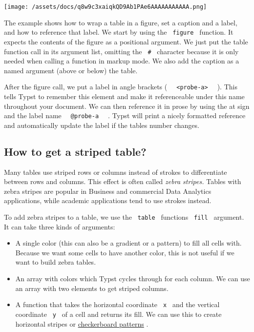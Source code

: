 \texttt{[image: /assets/docs/q8w9c3xaiqkQD9Ab1PAe6AAAAAAAAAAA.png]}

The example shows how to wrap a table in a figure, set a caption and a
label, and how to reference that label. We start by using the
\texttt{\ figure\ } function. It expects the contents of the figure as a
positional argument. We just put the table function call in its argument
list, omitting the \texttt{\ \#\ } character because it is only needed
when calling a function in markup mode. We also add the caption as a
named argument (above or below) the table.

After the figure call, we put a label in angle brackets (
\texttt{\ }{\texttt{\ \textless{}probe-a\textgreater{}\ }}\texttt{\ } ).
This tells Typst to remember this element and make it referenceable
under this name throughout your document. We can then reference it in
prose by using the at sign and the label name
\texttt{\ }{\texttt{\ @probe-a\ }}\texttt{\ } . Typst will print a
nicely formatted reference and automatically update the label if the
table\textquotesingle s number changes.

\subsection{How to get a striped table?}\label{fills}

Many tables use striped rows or columns instead of strokes to
differentiate between rows and columns. This effect is often called
\emph{zebra stripes.} Tables with zebra stripes are popular in Business
and commercial Data Analytics applications, while academic applications
tend to use strokes instead.

To add zebra stripes to a table, we use the \texttt{\ table\ }
function\textquotesingle s \texttt{\ fill\ } argument. It can take three
kinds of arguments:

\begin{itemize}
\tightlist
\item
  A single color (this can also be a gradient or a pattern) to fill all
  cells with. Because we want some cells to have another color, this is
  not useful if we want to build zebra tables.
\item
  An array with colors which Typst cycles through for each column. We
  can use an array with two elements to get striped columns.
\item
  A function that takes the horizontal coordinate \texttt{\ x\ } and the
  vertical coordinate \texttt{\ y\ } of a cell and returns its fill. We
  can use this to create horizontal stripes or
  \href{/docs/reference/layout/grid/\#definitions-cell}{checkerboard
  patterns} .
\end{itemize}

